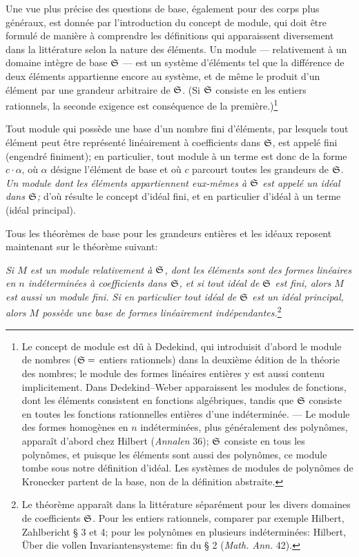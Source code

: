 Une vue plus précise des questions de base, également pour des corps plus généraux, est donnée par l'introduction du concept de module, qui doit être formulé de manière à comprendre les définitions qui apparaissent diversement dans la littérature selon la nature des éléments. Un module --- relativement à un domaine intègre de base \(\mathfrak S\) --- est un système d'éléments tel que la différence de deux éléments appartienne encore au système, et de même le produit d'un élément par une grandeur arbitraire de \(\mathfrak S\). (Si \(\mathfrak S\) consiste en les entiers rationnels, la seconde exigence est conséquence de la première.)\footnote{Le concept de module est dû à Dedekind, qui introduisit d'abord le module de nombres (\(\mathfrak S=\) entiers rationnels) dans la deuxième édition de la théorie des nombres; le module des formes linéaires entières y est aussi contenu implicitement. Dans Dedekind--Weber apparaissent les \og{}modules de fonctions\fg{}, dont les éléments consistent en fonctions algébriques, tandis que \(\mathfrak S\) consiste en toutes les fonctions rationnelles entières d'une indéterminée. --- Le module des formes homogènes en \(n\) indéterminées, plus généralement des polynômes, apparaît d'abord chez Hilbert (\emph{Annalen} 36); \(\mathfrak S\) consiste en tous les polynômes, et puisque les éléments sont aussi des polynômes, ce module tombe sous notre définition d'idéal. Les \og{}systèmes de modules\fg{} de polynômes de Kronecker partent de la base, non de la définition abstraite.}

Tout module qui possède une base d'un nombre fini d'éléments, par lesquels tout élément peut être représenté linéairement à coefficients dans \(\mathfrak S\), est appelé fini (engendré finiment); en particulier, tout module à un terme est donc de la forme \(c\cdot\alpha\), où \(\alpha\) désigne l'élément de base et où \(c\) parcourt toutes les grandeurs de \(\mathfrak S\). \emph{Un module dont les éléments appartiennent eux-mêmes à \(\mathfrak S\) est appelé un idéal dans \(\mathfrak S\);} d'où résulte le concept d'idéal fini, et en particulier d'idéal à un terme (idéal principal).

Tous les théorèmes de base pour les grandeurs entières et les idéaux reposent maintenant sur le théorème suivant:

\emph{Si \(M\) est un module relativement à \(\mathfrak S\), dont les éléments sont des formes linéaires en \(n\) indéterminées à coefficients dans \(\mathfrak S\), et si tout idéal de \(\mathfrak S\) est fini, alors \(M\) est aussi un module fini. Si en particulier tout idéal de \(\mathfrak S\) est un idéal principal, alors \(M\) possède une base de formes linéairement indépendantes.}\footnote{Le théorème apparaît dans la littérature séparément pour les divers domaines de coefficients \(\mathfrak S\). Pour les entiers rationnels, comparer par exemple Hilbert, Zahlbericht \S{} 3 et 4; pour les polynômes en plusieurs indéterminées: Hilbert, Über die vollen Invariantensysteme: fin du \S{} 2 (\emph{Math. Ann.} 42).}

